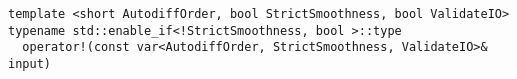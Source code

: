 \begin{tcolorbox}[colback=white,colframe=gray90, coltitle=black,boxrule=3pt,
fonttitle=\bfseries,title= Operator Unary Not]

\begin{verbatim}
template <short AutodiffOrder, bool StrictSmoothness, bool ValidateIO>
typename std::enable_if<!StrictSmoothness, bool >::type
  operator!(const var<AutodiffOrder, StrictSmoothness, ValidateIO>& input)

\end{verbatim}

\end{tcolorbox}

